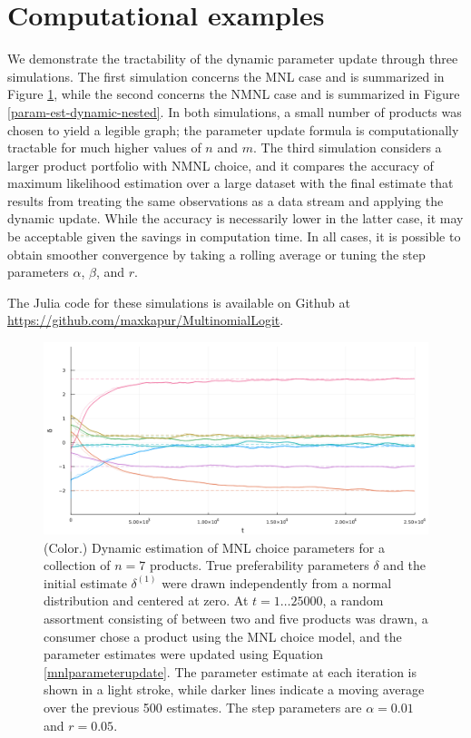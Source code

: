 \documentclass[preprint,12pt,authoryear]{elsarticle}
\begin{document}
\section{Computational examples} \label{computation}
We demonstrate the tractability of the dynamic parameter update through three simulations. The first simulation concerns the MNL case and is summarized in Figure \ref{param-est-dynamic-nonnested}, while the second concerns the NMNL case and is summarized in Figure \ref{param-est-dynamic-nested}. In both simulations, a small number of products was chosen to yield a legible graph; the parameter update formula is computationally tractable for much higher values of $n$ and $m$. The third simulation considers a larger product portfolio with NMNL choice, and it compares the accuracy of maximum likelihood estimation over a large dataset with the final estimate that results from treating the same observations as a data stream and applying the dynamic update. While the accuracy is necessarily lower in the latter case, it may be acceptable given the savings in computation time. In all cases, it is possible to obtain smoother convergence by taking a rolling average or tuning the step parameters $\alpha$, $\beta$, and $r$.

The Julia code for these simulations is available on Github at \url{https://github.com/maxkapur/MultinomialLogit}. 





\begin{figure}
\begin{center}\includegraphics[width=\textwidth]{param-est-dynamic-nonnested.png}\end{center}
\captionsetup{singlelinecheck=off}
    \caption[.]{(Color.) Dynamic estimation of MNL choice parameters for a collection of $n = 7$ products. True preferability parameters $\delta$ and the initial estimate $\delta^{(1)}$ were drawn independently from a normal distribution and centered at zero. At $t = 1 \dots 25000$, a random assortment consisting of between two and five products was drawn, a consumer chose a product using the MNL choice model, and the parameter estimates were updated using Equation \ref{mnlparameterupdate}. The parameter estimate at each iteration is shown in a light stroke, while darker lines indicate a moving average over the previous 500 estimates. The step parameters are $\alpha = 0.01$ and $r = 0.05$.}
\label{param-est-dynamic-nonnested}
\end{figure}
\end{document}
